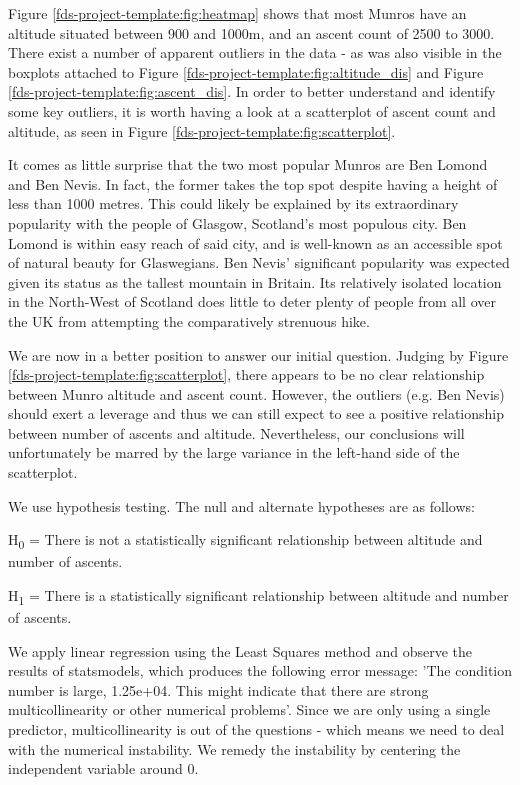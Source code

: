 \documentclass[11pt,a4paper]{article}
\begin{document}
Figure \ref{fds-project-template:fig:heatmap} shows that most Munros have an altitude situated between 900 and 1000m, and an ascent count of 2500 to 3000. There exist a number of apparent outliers in the data - as was also visible in the boxplots attached to Figure \ref{fds-project-template:fig:altitude_dis} and Figure \ref{fds-project-template:fig:ascent_dis}. In order to better understand and identify some key outliers, it is worth having a look at a scatterplot of ascent count and altitude, as seen in Figure \ref{fds-project-template:fig:scatterplot}.

\medskip

It comes as little surprise that the two most popular Munros are Ben Lomond and Ben Nevis. In fact, the former takes the top spot despite having a height of less than 1000 metres. This could likely be explained by its extraordinary popularity with the people of Glasgow, Scotland's most populous city. Ben Lomond is within easy reach of said city, and is well-known as an accessible spot of natural beauty for Glaswegians. Ben Nevis' significant popularity was expected given its status as the tallest mountain in Britain. Its relatively isolated location in the North-West of Scotland does little to deter plenty of people from all over the UK from attempting the comparatively strenuous hike.

\medskip 

We are now in a better position to answer our initial question. Judging by Figure \ref{fds-project-template:fig:scatterplot}, there appears to be no clear relationship between Munro altitude and ascent count. However, the outliers (e.g. Ben Nevis) should exert a leverage and thus we can still expect to see a positive relationship between number of ascents and altitude. Nevertheless, our conclusions will unfortunately be marred by the large variance in the left-hand side of the scatterplot.

\bigskip

We use hypothesis testing. The null and alternate hypotheses are as follows:

H\textsubscript{0} = There is not a statistically significant relationship between altitude and number of ascents.

H\textsubscript{1} = There is a statistically significant relationship between altitude and number of ascents.

\bigskip

We apply linear regression using the Least Squares method and observe the results of statsmodels, which produces the following error message: 'The condition number is large, 1.25e+04. This might indicate that there are
strong multicollinearity or other numerical problems'. Since we are only using a single predictor, multicollinearity is out of the questions - which means we need to deal with the numerical instability. We remedy the instability by centering the independent variable around 0.
\end{document}
